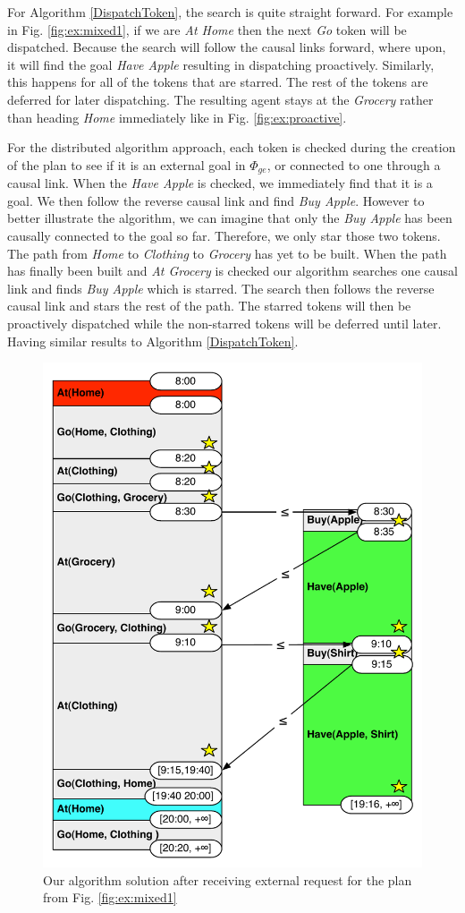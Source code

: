 For Algorithm \ref{DispatchToken}, the search is quite straight forward. For example in Fig. \ref{fig:ex:mixed1},
if we are {\em At Home} then the next {\em Go} token will be dispatched. Because the search will follow 
the causal links forward, where upon, it will find the goal {\em Have Apple} resulting in dispatching proactively.
Similarly, this happens for all of the tokens that are starred. The rest of the tokens are deferred
for later dispatching. The resulting agent stays at the {\em Grocery} rather than heading {\em Home} 
immediately like in Fig. \ref{fig:ex:proactive}.

For the distributed algorithm approach, each token is checked during the creation of the plan to see if it is 
an external goal in $\Phi_{ge}$, or connected to one through a causal link. When the {\em Have Apple} 
is checked, we immediately find that it is a goal. We then follow the reverse causal link and find {\em Buy Apple}.
However to better illustrate the algorithm, we can imagine that only the {\em Buy Apple} has been 
causally connected to the goal so far. Therefore, we only star those two tokens. The path from {\em Home} 
to {\em Clothing} to {\em Grocery} has yet to be built. When the path has finally
been built and {\em At Grocery} is checked our algorithm searches one causal link and finds {\em Buy Apple}
which is starred. The search then follows the reverse causal link and stars the rest of the path. The starred tokens will
then be proactively dispatched while the non-starred tokens will be deferred until later. Having similar results to Algorithm
\ref{DispatchToken}.

\begin{figure}
  \centering
  \includegraphics[width=0.8\columnwidth]{figs/example_MixedUpdate}
  \caption{Our algorithm solution after receiving external request for the plan from Fig. \ref{fig:ex:mixed1}}
  \label{fig:ex:mixed2}
\end{figure}

